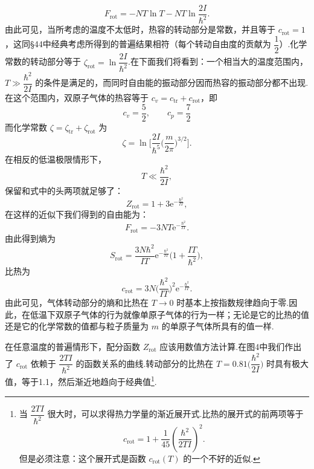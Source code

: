 \begin{equation}
  F_{\mathrm{rot}}=-NT\ln T-NT\ln\frac{2I}{\hbar^2}.
\end{equation}
由此可见，当所考虑的温度不太低时，热容的转动部分是常数，并且等于 $c_{\mathrm{rot}}=1$，这同§44中经典考虑所得到的普遍结果相符（每个转动自由度的贡献为 $\dfrac{1}{2}$）.化学常数的转动部分等于 $\zeta_{\mathrm{rot}}=\ln\dfrac{2I}{\hbar^2}$.在下面我们将看到：一个相当大的温度范围内，$T\gg\dfrac{\hbar^2}{2I}$ 的条件是满足的，而同时自由能的振动部分因而热容的振动部分都不出现.在这个范围内，双原子气体的热容等于 $c_v=c_{\mathrm{tr}}+c_{\mathrm{rot}}$，即
\begin{equation}
  c_v=\frac{5}{2},\qquad c_p=\frac{7}{2}
\end{equation}
而化学常数 $\zeta=\zeta_{\mathrm{tr}}+\zeta_{\mathrm{rot}}$ 为
\begin{equation}
  \zeta=\ln\Big[\frac{2I}{\hbar^5}\Big(\frac{m}{2\pi}\Big)^{3/2}\Big].
\end{equation}
在相反的低温极限情形下，
\begin{equation*}
  T\ll\frac{\hbar^2}{2I},
\end{equation*}
保留和式中的头两项就足够了：
\begin{equation*}
  Z_{\mathrm{rot}}=1+3\mathrm{e}^{-\frac{\hbar^2}{IT}},
\end{equation*}
在这样的近似下我们得到的自由能为：
\begin{equation}
  F_{\mathrm{rot}}=-3NT\mathrm{e}^{-\frac{\hbar^2}{IT}}.
\end{equation}
由此得到熵为
\begin{equation}
  S_{\mathrm{rot}}=\frac{3N\hbar^2}{IT}\mathrm{e}^{-\frac{\hbar^2}{IT}}
  \Big(1+\frac{IT}{\hbar^2}\Big),
\end{equation}
比热为
\begin{equation}
  c_{\mathrm{rot}}=3N\Big(\frac{\hbar^2}{IT}\Big)^2
  \mathrm{e}^{-\frac{\hbar^2}{IT}}.
\end{equation}
由此可见，气体转动部分的熵和比热在 $T\to0$ 时基本上按指数规律趋向于零.因此，在低温下双原子气体的行为就像单原子气体的行为一样；无论是它的比热的值还是它的化学常数的值都与粒子质量为 $m$ 的单原子气体所具有的值一样.

在任意温度的普遍情形下，配分函数 $Z_{\mathrm{rot}}$ 应该用数值方法计算.在图4中我们作出了 $c_{\mathrm{rot}}$ 依赖于 $\dfrac{2TI}{\hbar^2}$ 的函数关系的曲线.转动部分的比热在 $T=0.81\Big(\dfrac{\hbar^2}{2I}\Big)$ 时具有极大值，等于1.1，然后渐近地趋向于经典值\footnote{当 $\dfrac{2TI}{\hbar^2}$ 很大时，可以求得热力学量的渐近展开式.比热的展开式的前两项等于
\begin{equation*}
  c_{\mathrm{rot}}=1+\frac{1}{45}\left(\frac{\hbar^2}{2TI}\right)^2.
\end{equation*}
但是必须注意：这个展开式是函数 $c_{\mathrm{rot}}(T)$ 的一个不好的近似.}.

